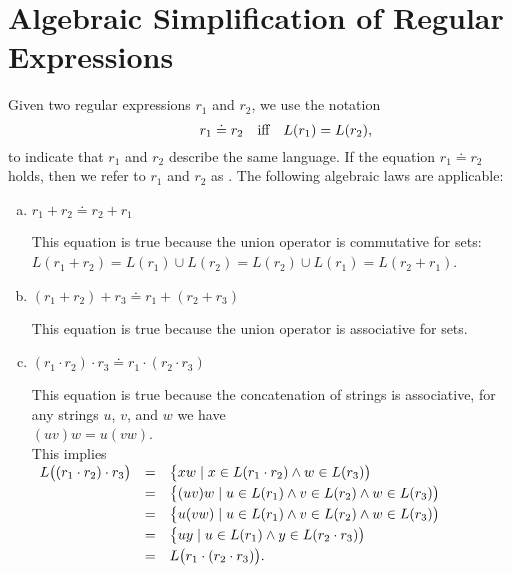 \section{Algebraic Simplification of Regular Expressions}
Given two regular expressions \( r_1 \) and \( r_2 \), we use the notation
\[
\hspace*{1.3cm}
r_1 \doteq r_2 \quad \text{iff} \quad L(r_1) = L(r_2),
\]
to indicate that \( r_1 \) and \( r_2 \) describe the same language. If the equation \( r_1 \doteq r_2 \)
holds, then we refer to \( r_1 \) and \( r_2 \) as . The following algebraic laws are
applicable: 
\begin{enumerate}[(a)]
\item $r_1 + r_2 \doteq r_2 + r_1$

      This equation is true because the union operator is commutative for sets:
      \\[0.2cm]
      \hspace*{1.3cm}
      $L(r_1 + r_2) = L(r_1) \cup L(r_2) = L(r_2) \cup L(r_1) = L(r_2 + r_1)$.
\item $(r_1 + r_2) + r_3 \doteq r_1 + (r_2 + r_3)$

      This equation is true because the union operator is associative for sets.
\item $(r_1 \cdot r_2) \cdot r_3 \doteq r_1 \cdot (r_2 \cdot r_3)$

      This equation is true because the concatenation of strings is associative, for any strings
      $u$, $v$, and $w$ we have
      \\[0.2cm]
      \hspace*{1.3cm}
      $(u v) w = u (v w)$.
      \\[0.2cm]
      This implies
      \\[0.2cm]
      \hspace*{1.3cm}
      $
      \begin{array}[t]{lcl}
        L\bigl( (r_1 \cdot r_2) \cdot r_3\bigr) 
        & = & \bigl\{ x w \mid x \in L(r_1 \cdot r_2) \wedge w \in L(r_3)\bigr) \\[0.1cm]
        & = & \bigl\{ (u v) w \mid u \in L(r_1) \wedge v \in L(r_2) \wedge w \in L(r_3)\bigr) \\[0.1cm]
        & = & \bigl\{ u (v w) \mid u \in L(r_1) \wedge v \in L(r_2) \wedge w \in L(r_3)\bigr) \\[0.1cm]
        & = & \bigl\{ u y \mid u \in L(r_1) \wedge y \in L(r_2 \cdot r_3)\bigr) \\[0.1cm]
        & = & L\bigl( r_1 \cdot (r_2 \cdot r_3)\bigr).
      \end{array}
      $


\end{enumerate}
